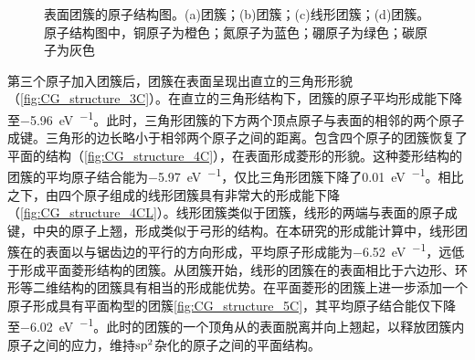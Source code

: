 \begin{figure}[htb]
{            \label{fig:CG_structure_4CL}
        }
        \caption{表面团簇的原子结构图。(a)团簇；(b)团簇；(c)线形团簇；(d)团簇。原子结构图中，铜原子为橙色；氮原子为蓝色；硼原子为绿色；碳原子为灰色}
        \label{fig:CG_structure_3-5C}
    \end{figure}

    第三个原子加入团簇后，团簇在表面呈现出直立的三角形形貌（\ref{fig:CG_structure_3C}）。在直立的三角形结构下，团簇的原子平均形成能下降至\SI{-5.96}{\electronvolt\per\atom}。此时，三角形团簇的下方两个顶点原子与表面的相邻的两个原子成键。三角形的边长略小于相邻两个原子之间的距离。包含四个原子的团簇恢复了平面的结构（\ref{fig:CG_structure_4C}），在表面形成菱形的形貌。这种菱形结构的团簇的平均原子结合能为\SI{-5.97}{\electronvolt\per\atom}，仅比三角形团簇下降了\SI{0.01}{\electronvolt\per\atom}。相比之下，由四个原子组成的线形团簇具有非常大的形成能下降（\ref{fig:CG_structure_4CL}）。线形团簇类似于团簇，线形的两端与表面的原子成键，中央的原子上翘，形成类似于弓形的结构。在本研究的形成能计算中，线形团簇在的表面以与锯齿边的平行的方向形成，平均原子形成能为\SI{-6.52}{\electronvolt\per\atom}，远低于形成平面菱形结构的团簇。从团簇开始，线形的团簇在的表面相比于六边形、环形等二维结构的团簇具有相当的形成能优势。在平面菱形的团簇上进一步添加一个原子形成具有平面构型的团簇\ref{fig:CG_structure_5C}，其平均原子结合能仅下降至\SI{-6.02}{\electronvolt\per\atom}。此时的团簇的一个顶角从的表面脱离并向上翘起，以释放团簇内原子之间的应力，维持$\rm sp^2$杂化的原子之间的平面结构。

